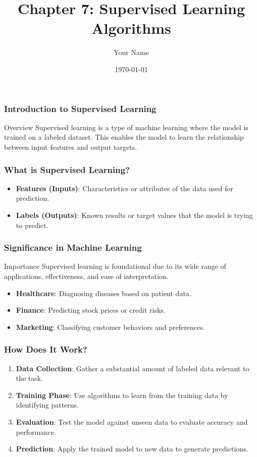 \documentclass{beamer}
\title{Chapter 7: Supervised Learning Algorithms}
\author{Your Name}
\institute{Your Institution}
\date{\today}
\begin{document}
\frame{\titlepage}

\begin{frame}[fragile]
    \frametitle{Introduction to Supervised Learning}
    \begin{block}{Overview}
        Supervised learning is a type of machine learning where the model is trained on a labeled dataset. This enables the model to learn the relationship between input features and output targets.
    \end{block}
\end{frame}

\begin{frame}[fragile]
    \frametitle{What is Supervised Learning?}
    \begin{itemize}
        \item \textbf{Features (Inputs)}: Characteristics or attributes of the data used for prediction.
        \item \textbf{Labels (Outputs)}: Known results or target values that the model is trying to predict.
    \end{itemize}
\end{frame}

\begin{frame}[fragile]
    \frametitle{Significance in Machine Learning}
    \begin{block}{Importance}
        Supervised learning is foundational due to its wide range of applications, effectiveness, and ease of interpretation.
    \end{block}
    \begin{itemize}
        \item \textbf{Healthcare}: Diagnosing diseases based on patient data.
        \item \textbf{Finance}: Predicting stock prices or credit risks.
        \item \textbf{Marketing}: Classifying customer behaviors and preferences.
    \end{itemize}
\end{frame}

\begin{frame}[fragile]
    \frametitle{How Does It Work?}
    \begin{enumerate}
        \item \textbf{Data Collection}: Gather a substantial amount of labeled data relevant to the task.
        \item \textbf{Training Phase}: Use algorithms to learn from the training data by identifying patterns.
        \item \textbf{Evaluation}: Test the model against unseen data to evaluate accuracy and performance.
        \item \textbf{Prediction}: Apply the trained model to new data to generate predictions.
    \end{enumerate}
\end{frame}
\end{document}
